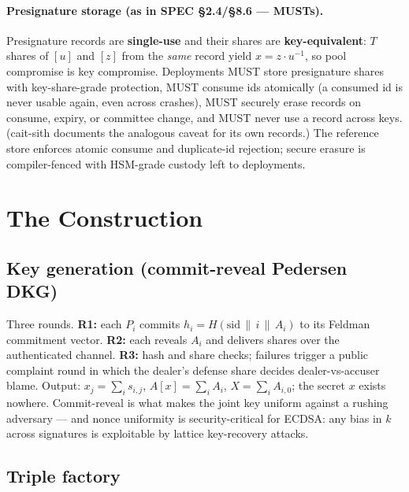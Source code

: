 \documentclass[11pt]{article}
\theoremstyle{plain}
\theoremstyle{definition}
\theoremstyle{remark}
\newcommand{\share}[1]{[#1]}
\newcommand{\sid}{\mathrm{sid}}
\begin{document}
\paragraph{Presignature storage (as in SPEC \S2.4/\S8.6 --- MUSTs).} Presignature records are \textbf{single-use} and their shares are \textbf{key-equivalent}: $T$ shares of $\share{u}$ and $\share{z}$ from the \emph{same} record yield $x = z \cdot u^{-1}$, so pool compromise is key compromise. Deployments MUST store presignature shares with key-share-grade protection, MUST consume ids atomically (a consumed id is never usable again, even across crashes), MUST securely erase records on consume, expiry, or committee change, and MUST never use a record across keys. (cait-sith documents the analogous caveat for its own records.) The reference store enforces atomic consume and duplicate-id rejection; secure erasure is compiler-fenced with HSM-grade custody left to deployments.

\section{The Construction}\label{sec:construction}

\subsection{Key generation (commit-reveal Pedersen DKG)}

Three rounds. \textbf{R1:} each $P_i$ commits $h_i = H(\sid \,\|\, i \,\|\, A_i)$ to its Feldman commitment vector. \textbf{R2:} each reveals $A_i$ and delivers shares over the authenticated channel. \textbf{R3:} hash and share checks; failures trigger a public complaint round in which the dealer's defense share decides dealer-vs-accuser blame. Output: $x_j = \sum_i s_{i,j}$, $A\share{x} = \sum_i A_i$, $X = \sum_i A_{i,0}$; the secret $x$ exists nowhere. Commit-reveal is what makes the joint key uniform against a rushing adversary --- and nonce uniformity is security-critical for ECDSA: any bias in $k$ across signatures is exploitable by lattice key-recovery attacks.

\subsection{Triple factory}
\end{document}
